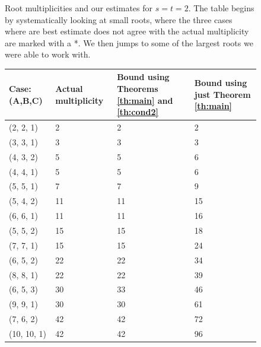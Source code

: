 \documentclass{amsart}
\numberwithin{equation}{section}
\numberwithin{figure}{section}
\numberwithin{table}{section}
\theoremstyle{definition}
\begin{document}
\begin{figure}
\caption{\label{fig:22} Root multiplicities and our estimates for $s=t=2$. The table begins by systematically looking at small roots, where the three cases where are best estimate does not agree with the actual multiplicity are marked with a *. We then jumps to some of the largest roots we were able to work with.}
\end{figure}


\begin{figure}
\begin{tabular}{|p{2cm}||p{3cm}|p{3cm}|p{3cm}|}

\hline


Case: (A,B,C)  & Actual multiplicity & Bound using  Theorems \ref{th:main} and \ref{th:cond2}  & Bound using just Theorem \ref{th:main}\\

\hline

(2, 2, 1)   & 2    & 2    & 2    \\

(3, 3, 1)   & 3    & 3    & 3    \\

(4, 3, 2)   & 5    & 5    & 6    \\

(4, 4, 1)   & 5    & 5    & 6    \\

(5, 5, 1)   & 7    & 7    & 9    \\

(5, 4, 2)   & 11   & 11   & 15   \\

(6, 6, 1)   & 11   & 11   & 16   \\

(5, 5, 2)   & 15   & 15   & 18   \\

(7, 7, 1)   & 15   & 15   & 24   \\

(6, 5, 2)   & 22   & 22   & 34   \\

(8, 8, 1)   & 22   & 22   & 39   \\

(6, 5, 3)   & 30   & 33   & 46   \\

(9, 9, 1)   & 30   & 30   & 61   \\

(7, 6, 2)   & 42   & 42   & 72   \\

(10, 10, 1) & 42   & 42   & 96   \\


\end{tabular}
\end{figure}
\end{document}
